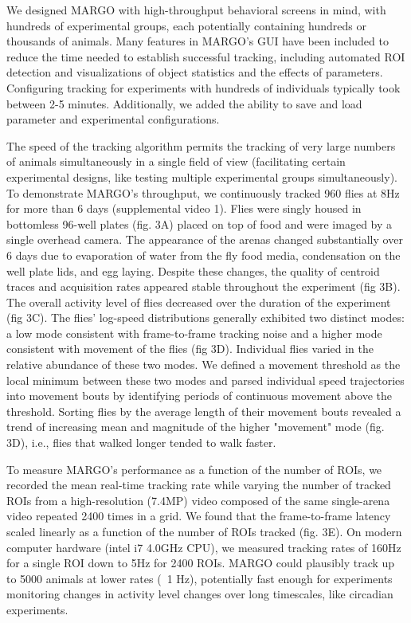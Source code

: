 \documentclass[10pt,letterpaper]{article}
\begin{document}
We designed MARGO with high-throughput behavioral screens in mind, with hundreds of experimental groups, each potentially containing hundreds or thousands of animals. Many features in MARGO's GUI have been included to reduce the time needed to establish successful tracking, including automated ROI detection and visualizations of object statistics and the effects of parameters. Configuring tracking for experiments with hundreds of individuals typically took between 2-5 minutes. Additionally, we added the ability to save and load parameter and experimental configurations.

The speed of the tracking algorithm permits the tracking of very large numbers of animals simultaneously in a single field of view (facilitating certain experimental designs, like testing multiple experimental groups simultaneously). To demonstrate MARGO's throughput, we continuously tracked 960 flies at 8Hz for more than 6 days (supplemental video 1). Flies were singly housed in bottomless 96-well plates (fig. 3A) placed on top of food and were imaged by a single overhead camera. The appearance of the arenas changed substantially over 6 days due to evaporation of water from the fly food media, condensation on the well plate lids, and egg laying. Despite these changes, the quality of centroid traces and acquisition rates appeared stable throughout the experiment (fig 3B). The overall activity level of flies decreased over the duration of the experiment (fig 3C). The flies' log-speed distributions generally exhibited two distinct modes: a low mode consistent with frame-to-frame tracking noise and a higher mode consistent with movement of the flies (fig 3D)\cite{berman_choi_bialek_shaevitz_2014,Crall_2016_cockroach}. Individual flies varied in the relative abundance of these two modes. We defined a movement threshold as the local minimum between these two modes and parsed individual speed trajectories into movement bouts by identifying periods of continuous movement above the threshold. Sorting flies by the average length of their movement bouts revealed a trend of increasing mean and magnitude of the higher "movement" mode (fig. 3D), i.e., flies that walked longer tended to walk faster.

To measure MARGO's performance as a function of the number of ROIs, we recorded the mean real-time tracking rate while varying the number of tracked ROIs from a high-resolution (7.4MP) video composed of the same single-arena video repeated 2400 times in a grid. We found that the frame-to-frame latency scaled linearly as a function of the number of ROIs tracked (fig. 3E). On modern computer hardware (intel i7 4.0GHz CPU), we measured tracking rates of 160Hz for a single ROI down to 5Hz for 2400 ROIs. MARGO could plausibly track up to 5000 animals at lower rates (~1 Hz), potentially fast enough for experiments monitoring changes in activity level changes over long timescales, like circadian experiments.
\end{document}
